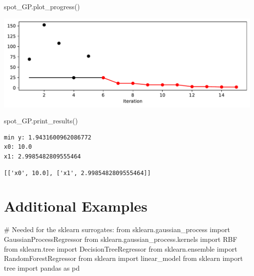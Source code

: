 \documentclass[
  letterpaper,
  DIV=11,
  numbers=noendperiod]{scrreprt}
\newenvironment{Shaded}{\begin{snugshade}}{\end{snugshade}}
\newcommand{\CommentTok}[1]{\textcolor[rgb]{0.37,0.37,0.37}{#1}}
\newcommand{\ImportTok}[1]{\textcolor[rgb]{0.00,0.46,0.62}{#1}}
\newcommand{\NormalTok}[1]{\textcolor[rgb]{0.00,0.23,0.31}{#1}}
\begin{document}
\begin{Shaded}
\begin{Highlighting}[]
\NormalTok{spot\_GP.plot\_progress()}
\end{Highlighting}
\end{Shaded}

\includegraphics{012_num_spot_ei_files/figure-pdf/cell-34-output-1.pdf}

\begin{Shaded}
\begin{Highlighting}[]
\NormalTok{spot\_GP.print\_results()}
\end{Highlighting}
\end{Shaded}

\begin{verbatim}
min y: 1.9431600962086772
x0: 10.0
x1: 2.9985482809555464
\end{verbatim}

\begin{verbatim}
[['x0', 10.0], ['x1', 2.9985482809555464]]
\end{verbatim}

\section{Additional Examples}\label{additional-examples}

\begin{Shaded}
\begin{Highlighting}[]
\CommentTok{\# Needed for the sklearn surrogates:}
\ImportTok{from}\NormalTok{ sklearn.gaussian\_process }\ImportTok{import}\NormalTok{ GaussianProcessRegressor}
\ImportTok{from}\NormalTok{ sklearn.gaussian\_process.kernels }\ImportTok{import}\NormalTok{ RBF}
\ImportTok{from}\NormalTok{ sklearn.tree }\ImportTok{import}\NormalTok{ DecisionTreeRegressor}
\ImportTok{from}\NormalTok{ sklearn.ensemble }\ImportTok{import}\NormalTok{ RandomForestRegressor}
\ImportTok{from}\NormalTok{ sklearn }\ImportTok{import}\NormalTok{ linear\_model}
\ImportTok{from}\NormalTok{ sklearn }\ImportTok{import}\NormalTok{ tree}
\ImportTok{import}\NormalTok{ pandas }\ImportTok{as}\NormalTok{ pd}
\end{Highlighting}
\end{Shaded}
\end{document}
